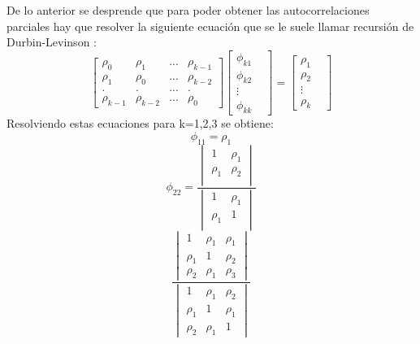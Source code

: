 \documentclass{report}
\begin{document}
De lo anterior se desprende que para poder obtener las autocorrelaciones parciales hay que resolver la siguiente ecuación que se le suele llamar recursión de Durbin-Levinson :\\
\begin{equation}
\begin{bmatrix}
\rho_{0} & \rho_{1} & ... & \rho_{k-1}\\
\rho_{1} & \rho_{0} & ... & \rho_{k-2}\\
. & . & ... & . \\
\rho_{k-1} & \rho_{k-2} & ... & \rho_{0}
\end{bmatrix}
\begin{bmatrix}
\phi_{k1} \\
 \phi_{k2}\\
\vdots &  \\
\phi_{kk}
\end{bmatrix}=
\begin{bmatrix}
\rho_{1} \\
\rho_{2}\\
\vdots &  \\
\rho_{k}
\end{bmatrix}
\end{equation}
Resolviendo estas ecuaciones para k=1,2,3 se obtiene:\\
\begin{equation}
    \phi_{11}=\rho_{1}
\end{equation}
\begin{equation}
    \phi_{22}=
\frac{\begin{vmatrix}
1 & \rho_{1} \\
\rho_{1} & \rho_{2} \\
\end{vmatrix}}{\begin{vmatrix}
1 & \rho_{1} \\
\rho_{1} & 1 \\
\end{vmatrix}}
\end{equation}
\begin{equation}
    \frac{\begin{vmatrix}
1 & \rho_{1} & \rho_{1} \\
\rho_{1} & 1 & \rho_{2}  \\
\rho_{2} & \rho_{1} & \rho_{3}
\end{vmatrix}}{\begin{vmatrix}
1 & \rho_{1} & \rho_{2} \\
\rho_{1} & 1 & \rho_{1}\\
\rho_{2} & \rho_{1} & 1
\end{vmatrix}}
\end{equation}
\end{document}
